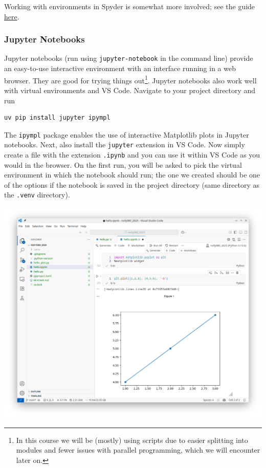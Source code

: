 Working with environments in Spyder is somewhat more involved; see the guide \href{https://github.com/spyder-ide/spyder/wiki/Working-with-packages-and-environments-in-Spyder#working-with-other-environments-and-python-installations}{here}.

\subsubsection{Jupyter Notebooks}
Jupyter notebooks (run using \verb|jupyter-notebook| in the command line) provide an easy-to-use interactive environment with an interface running in a web browser. They are good for trying things out\footnote{In this course we will be (mostly) using scripts due to easier splitting into modules and fewer issues with parallel programming, which we will encounter later on.}. Jupyter notebooks also work well with virtual environments and VS Code. Navigate to your project directory and run
\begin{lstlisting}
uv pip install jupyter ipympl
\end{lstlisting}
The \verb|ipympl| package enables the use of interactive Matplotlib plots in Jupyter notebooks. Next, also install the \verb|jupyter| extension in VS Code. Now simply create a file with the extension \verb|.ipynb| and you can use it within VS Code as you would in the browser. On the first run, you will be asked to pick the virtual environment in which the notebook should run; the one we created should be one of the options if the notebook is saved in the project directory (same directory as the \verb|.venv| directory).

\begin{center}
    \includegraphics[width=0.9\linewidth]{vscode_jupyter.png}
\end{center}